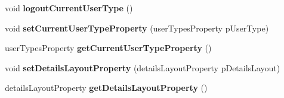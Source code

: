 \begin{DoxyCompactItemize}
\item 
\hypertarget{classQELogin_a0cb38d4f6f4d761119874e9d196905bb}{
void {\bfseries logoutCurrentUserType} ()}
\label{classQELogin_a0cb38d4f6f4d761119874e9d196905bb}

\item 
\hypertarget{classQELogin_a666726d3a1378e92daa8f159e6a18b49}{
void {\bfseries setCurrentUserTypeProperty} (userTypesProperty pUserType)}
\label{classQELogin_a666726d3a1378e92daa8f159e6a18b49}

\item 
\hypertarget{classQELogin_a99033119aa0a5e58f05105a3532486a2}{
userTypesProperty {\bfseries getCurrentUserTypeProperty} ()}
\label{classQELogin_a99033119aa0a5e58f05105a3532486a2}

\item 
\hypertarget{classQELogin_a881e29f43cee185fb03a5d60c27d6483}{
void {\bfseries setDetailsLayoutProperty} (detailsLayoutProperty pDetailsLayout)}
\label{classQELogin_a881e29f43cee185fb03a5d60c27d6483}

\item 
\hypertarget{classQELogin_a9590edb8a86304008e5036710e4f95b2}{
detailsLayoutProperty {\bfseries getDetailsLayoutProperty} ()}
\label{classQELogin_a9590edb8a86304008e5036710e4f95b2}

\end{DoxyCompactItemize}
